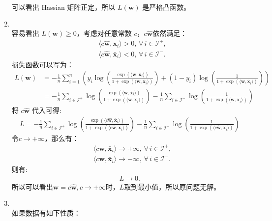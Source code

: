 \documentclass[11pt,letter,notitlepage]{article}
\begin{document}
\begin{solution}
\begin{enumerate}
	可以看出 Hassian 矩阵正定，所以 $L(\textbf{w})$ 是严格凸函数。
	\item \ \\
	容易看出 $L(\textbf{w}) \geq 0$，考虑对任意常数 $c$，$c\hat{\mathbf{w}}$依然满足：
	\begin{align*}
	    &\langle c\hat{\mathbf{w}}, \mathbf{\bar{x}}_i\rangle>0,\,\forall\,i\in\mathcal{I}^+,\\
	    &\langle c\hat{\mathbf{w}}, \mathbf{\bar{x}}_i\rangle<0,\,\forall\,i\in\mathcal{I}^-.
	\end{align*}
	损失函数可以写为：
	\begin{align*}
		L(\textbf{w})&=-\frac{1}{n}\sum_{i=1}^n \left( y_i \log ( \frac{\exp(\langle \textbf{w},  \overline{\mathbf{x}}_i \rangle)}{1+\exp(\langle \textbf{w},  \overline{\mathbf{x}}_i \rangle) } ) + (1-y_i)\log ( \frac{1}{1+\exp(\langle \textbf{w},  \overline{\mathbf{x}}_i \rangle)} ) \right)\\
		&=-\frac{1}{n}\sum_{i\in\mathcal{I}^+}\log ( \frac{\exp(\langle \textbf{w},  \overline{\mathbf{x}}_i \rangle)}{1+\exp(\langle \textbf{w},  \overline{\mathbf{x}}_i \rangle) } ) -\frac{1}{n}\sum_{i\in\mathcal{I}^-}\log ( \frac{1}{1+\exp(\langle \textbf{w},  \overline{\mathbf{x}}_i \rangle)} )
	\end{align*}
	将 $c\hat{\mathbf{w}}$ 代入可得:
	\begin{align*}
		L = -\frac{1}{n}\sum_{i\in\mathcal{I}^+}\log ( \frac{\exp(\langle c\hat{\textbf{w}},  \overline{\mathbf{x}}_i \rangle)}{1+\exp(\langle c\hat{\textbf{w}},  \overline{\mathbf{x}}_i \rangle) } ) -\frac{1}{n}\sum_{i\in\mathcal{I}^-}\log ( \frac{1}{1+\exp(\langle c\hat{\textbf{w}},  \overline{\mathbf{x}}_i \rangle)} )
	\end{align*}
	令$c\rightarrow +\infty$，那么有：
	\begin{align*}
	    &\langle c\hat{\mathbf{w}}, \mathbf{\bar{x}}_i\rangle \rightarrow +\infty,\,\forall\,i\in\mathcal{I}^+,\\
	    &\langle c\hat{\mathbf{w}}, \mathbf{\bar{x}}_i\rangle \rightarrow -\infty,\,\forall\,i\in\mathcal{I}^-.
	\end{align*}
	则有:
	\begin{align*}
		L \rightarrow 0.
	\end{align*}
	所以可以看出$\mathbf{w} = c\hat{\mathbf{w}}, c \rightarrow +\infty$时，$L$取到最小值，所以原问题无解。
	\item \ \\
	如果数据有如下性质：
	\begin{align*}

\end{align*}
\end{enumerate}
\end{solution}
\end{document}
